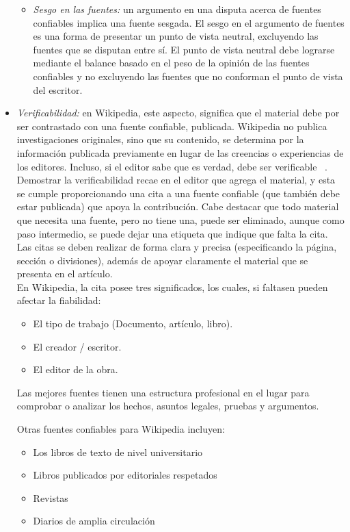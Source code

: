 \begin{itemize}
\begin{itemize}
\item \emph{Sesgo en las fuentes:} un argumento en una disputa acerca de fuentes confiables implica una fuente sesgada. El sesgo en el argumento de fuentes es una forma de presentar un punto de vista neutral, excluyendo las fuentes que se disputan entre s\'i.
El punto de vista neutral debe lograrse mediante el balance basado en el peso de la opini\'on de las fuentes confiables y no excluyendo las fuentes que no conforman el punto de vista del escritor.

\end{itemize}


\item \emph{Verificabilidad:} en Wikipedia, este aspecto, significa que el material debe por ser contrastado con una fuente confiable, publicada.
Wikipedia no publica investigaciones originales, sino que su contenido, se determina por la informaci\'on publicada previamente en lugar de las creencias o experiencias de los editores. Incluso, si el editor sabe que es verdad, debe ser verificable ~\cite{Wiki:15}.
Demostrar la verificabilidad recae en el editor que agrega el material, y esta se cumple proporcionando una cita a una fuente confiable (que tambi\'en debe estar publicada) que apoya la contribuci\'on. Cabe destacar que todo material que necesita una fuente, pero no tiene una, puede ser eliminado, aunque como paso intermedio, se puede dejar una etiqueta que indique que falta la cita.
Las citas se deben realizar de forma clara y precisa (especificando la p\'agina, secci\'on o divisiones), adem\'as de apoyar claramente el material que se presenta en el art\'iculo.\\
En Wikipedia, la cita posee tres significados, los cuales, si faltasen pueden afectar la fiabilidad:
\begin{itemize}
\item El tipo de trabajo (Documento, art\'iculo, libro).
\item El creador / escritor.
\item El editor de la obra.
\end{itemize}
Las mejores fuentes tienen una estructura profesional en el lugar para comprobar o analizar los hechos, asuntos legales, pruebas y argumentos.

Otras fuentes confiables para Wikipedia incluyen:

\begin{itemize}
\item Los libros de texto de nivel universitario
\item Libros publicados por editoriales respetados
\item Revistas
\item Diarios de amplia circulaci\'on
\end{itemize}


\end{itemize}
